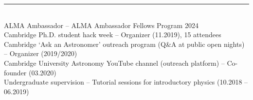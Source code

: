 \documentclass[10pt,preprint]{aastex}
\newcommand{\jj}[1]{\textcolor{red}{#1}}
\newcommand*{\xdash}[1][3em]{\rule[0.5ex]{#1}{0.7pt}}
\begin{document}
 \xdash[83ex] \\
\noindent ALMA Ambassador -- ALMA Ambassador Fellows Program 2024 \\
\noindent Cambridge Ph.D. student hack week -- Organizer (11.2019), 15 attendees \\
\noindent Cambridge \lq{}Ask an Astronomer\rq{} outreach program (Q\&A at public open nights) -- Organizer (2019/2020) \\
\noindent Cambridge University Astronomy %
YouTube channel (outreach platform) -- Co-founder (03.2020) \\
\noindent Undergraduate supervision -- Tutorial sessions for introductory physics (10.2018 -- 06.2019)



\end{document}
